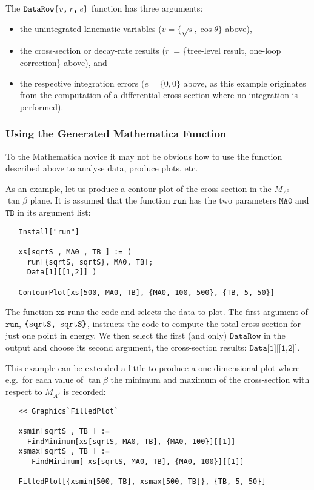\documentclass[twoside,11pt]{article}
\def\Var#1{\ensuremath{\mathit{#1}}}
\def\Ve{\Var{e}}
\def\Vr{\Var{r}}
\def\Vv{\Var{v}}
\def\Code#1{\ensuremath{\texttt{#1}}}
\def\eg{e.g.\ }
\def\lbrac{\symbol{123}}
\def\rbrac{\symbol{125}}
\def\Brac#1{\lbrac#1\rbrac}
\begin{document}
The \Code{DataRow[\Vv,\,\Vr,\,\Ve]} function has three arguments:
\begin{itemize}
\item
the unintegrated kinematic variables ($\Vv = \{\sqrt s, \cos\theta\}$ 
above),

\item
the cross-section or decay-rate results (\Vr\ = \{tree-level result,
one-loop correction\} above), and

\item
the respective integration errors ($\Ve = \{0, 0\}$ above, as this 
example originates from the computation of a differential cross-section 
where no integration is performed).
\end{itemize}


\subsubsection{Using the Generated Mathematica Function}

To the Mathematica novice it may not be obvious how to use the function 
described above to analyse data, produce plots, etc.

As an example, let us produce a contour plot of the cross-section in the
$M_{A^0}$--$\tan\beta$ plane.  It is assumed that the function
\Code{run} has the two parameters \Code{MA0} and \Code{TB} in its
argument list:
\begin{verbatim}
   Install["run"]

   xs[sqrtS_, MA0_, TB_] := (
     run[{sqrtS, sqrtS}, MA0, TB];
     Data[1][[1,2]] )

   ContourPlot[xs[500, MA0, TB], {MA0, 100, 500}, {TB, 5, 50}]
\end{verbatim}
The function \Code{xs} runs the code and selects the data to plot.  
The first argument of \Code{run}, \Code{\Brac{sqrtS, sqrtS}}, instructs
the code to compute the total cross-section for just one point in energy.  
We then select the first (and only) \Code{DataRow} in the output and 
choose its second argument, the cross-section results:
\Code{Data[1][[1,2]]}.

This example can be extended a little to produce a one-dimensional
plot where \eg for each value of $\tan\beta$ the minimum and maximum
of the cross-section with respect to $M_{A^0}$ is recorded:
\begin{verbatim}
   << Graphics`FilledPlot`

   xsmin[sqrtS_, TB_] :=
     FindMinimum[xs[sqrtS, MA0, TB], {MA0, 100}][[1]]
   xsmax[sqrtS_, TB_] :=
     -FindMinimum[-xs[sqrtS, MA0, TB], {MA0, 100}][[1]]

   FilledPlot[{xsmin[500, TB], xsmax[500, TB]}, {TB, 5, 50}]
\end{verbatim}
\end{document}
